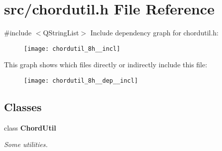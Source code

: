 \section{src/chordutil.h File Reference}
\label{chordutil_8h}
{\ttfamily \#include $<$Q\+String\+List$>$}\newline
Include dependency graph for chordutil.\+h\+:\nopagebreak
\begin{figure}[H]
\begin{center}
\leavevmode
\texttt{[image: chordutil\_8h\_\_incl]}
\end{center}
\end{figure}
This graph shows which files directly or indirectly include this file\+:\nopagebreak
\begin{figure}[H]
\begin{center}
\leavevmode
\texttt{[image: chordutil\_8h\_\_dep\_\_incl]}
\end{center}
\end{figure}
\subsection*{Classes}
\begin{DoxyCompactItemize}
\item 
class \textbf{ Chord\+Util}
\begin{DoxyCompactList}\small\item\em Some utilities. \end{DoxyCompactList}\end{DoxyCompactItemize}
